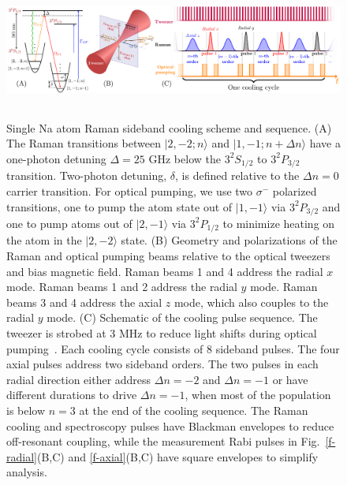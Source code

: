 \documentclass[aps,prl,twocolumn,groupedaddress]{revtex4-1}
\begin{document}
\begin{figure}
  \includegraphics[height=4.5cm]{fig1_combined.pdf}
  \caption{Single Na atom Raman sideband cooling scheme and sequence. (A)
    The Raman transitions between $|2,-2;n\rangle$ and $|1,-1;n+\Delta n\rangle$ have a one-photon detuning $\Delta=25$ GHz below the $3^2S_{1/2}$ to $3^2P_{3/2}$ transition. Two-photon detuning, $\delta$, is defined relative to the $\Delta n=0$ carrier transition. For optical pumping, we use two $\sigma^-$ polarized transitions, one   to  pump the atom state out of $|1,-1\rangle$ via $3^2P_{3/2}$ and one  to pump atoms out of $|2,-1\rangle$ via $3^2P_{1/2}$
     to minimize heating on the atom in the $|2,-2\rangle$ state.
    (B) Geometry and polarizations of the Raman and optical pumping beams relative to the
    optical tweezers and bias magnetic field.  Raman beams 1 and 4 address the radial $x$ mode. Raman beams 1 and 2 address the radial $y$ mode. Raman beams 3 and 4 address the axial $z$ mode, which also couples to the radial $y$ mode.
    (C) Schematic of the cooling pulse sequence. The tweezer is strobed at 3 MHz to
    reduce light shifts during optical pumping~\cite{Hutzler2017-LightShifts}.
    Each cooling cycle consists of $8$ sideband pulses.
    The four axial pulses address two sideband orders.
    The two pulses in each radial direction  either address $\Delta n=-2$ and $\Delta n=-1$
    or have different durations to drive $\Delta n=-1$, when most of the population is below $n=3$
    at the end of the cooling sequence.
    The Raman cooling and spectroscopy pulses have Blackman  envelopes to reduce  off-resonant
    coupling, while the measurement Rabi pulses in Fig.~\ref{f-radial}(B,C) and \ref{f-axial}(B,C) have square envelopes to simplify analysis.
    \label{f-setup}}
\end{figure}
\end{document}
